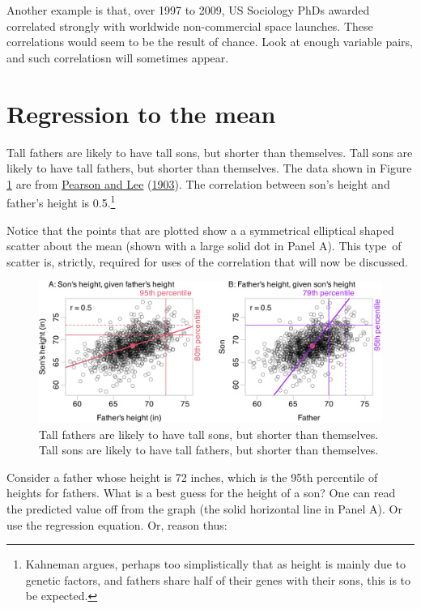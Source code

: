 \documentclass[
  10pt,
  b5paper]{book}
\begin{document}
Another example is that, over 1997 to 2009, US Sociology PhDs
awarded correlated strongly with worldwide non-commercial
space launches. These correlations would seem to be the
result of chance. Look at enough variable pairs, and such
correlatiosn will sometimes appear.

\hypertarget{regression-to-the-mean}{%
\section{Regression to the mean}\label{regression-to-the-mean}}

Tall fathers are likely to have tall sons, but shorter than themselves.
Tall sons are likely to have tall fathers, but shorter than themselves.
The data shown in Figure \ref{fig:pearson} are from \protect\hyperlink{ref-pearson1903laws}{Pearson and Lee} (\protect\hyperlink{ref-pearson1903laws}{1903}).
The correlation between son's height and father's height is
0.5.\footnote{Kahneman argues, perhaps too simplistically that as height is
  mainly due to genetic factors, and fathers share half of their genes
  with their sons, this is to be expected.}

Notice that the points that are plotted show a a symmetrical
elliptical shaped scatter about the mean (shown with a large solid
dot in Panel A). This type~of scatter is, strictly, required
for uses of the correlation that will now be discussed.

\begin{figure}[H]

{\centering \includegraphics[width=1\linewidth]{07-regress_files/figure-latex/pearson-1} 

}

\caption{Tall fathers are likely to have tall sons, but shorter than themselves. 
Tall sons are likely to have tall fathers, but shorter than themselves.}\label{fig:pearson}
\end{figure}

Consider a father whose height is 72 inches, which is the
95th percentile of heights for fathers. What is a best guess
for the height of a son? One can read the predicted value off
from the graph (the solid horizontal line in Panel A). Or use
the regression equation. Or, reason thus:
\end{document}
